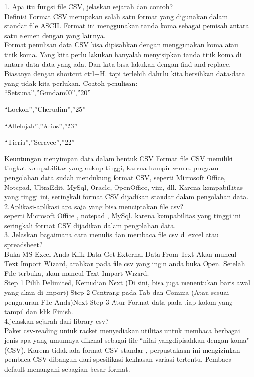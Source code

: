 1. Apa itu fungsi file CSV, jelaskan sejarah dan contoh?\\
Definisi
Format CSV merupakan salah satu format yang digunakan dalam standar file ASCII. Format ini menggunakan tanda koma sebagai pemisah antara satu elemen dengan yang lainnya.\\

Format penulisan data
CSV bisa dipisahkan dengan menggunakan koma atau titik koma. Yang kita perlu lakukan hanyalah menyisipkan tanda titik koma di antara data-data yang ada. Dan kita bisa lakukan dengan find and replace. Biasanya dengan shortcut ctrl+H. tapi terlebih dahulu kita bersihkan data-data yang tidak kita perlukan.
Contoh penulisan:\\
“Setsuna”,”Gundam00”,”20”

“Lockon”,”Cherudim”,”25”

“Allelujah”,”Arios”,”23”

“Tieria”,”Seravee”,”22”

Keuntungan menyimpan data dalam bentuk CSV
Format file CSV memiliki tingkat kompabilitas yang cukup tinggi, karena hampir semua program pengolahan data sudah mendukung format CSV, seperti Microsoft Office, Notepad, UltraEdit, MySql, Oracle, OpenOffice, vim, dll. Karena kompabillitas yang tinggi ini, seringkali format CSV dijadikan standar dalam pengolahan data.\\

2.Aplikasi-aplikasi apa saja yang bisa menciptakan file csv?\\
seperti Microsoft Office , notepad , MySql. karena kompabilitas yang tinggi ini seringkali format CSV dijadikan dalam pengolahan data.\\

3. Jelaskan bagaimana cara menulis dan membaca file csv di excel atau spreadsheet?\\
Buka MS Excel Anda
Klik Data Get External Data From Text
Akan muncul Text Import Wizard, arahkan pada file csv yang ingin anda buka Open.
Setelah File terbuka, akan muncul Text Import Wizard.\\

Step 1 Pilih Delimited, Kemudian Next (Di sini, bisa juga menentukan baris awal yang akan di import)
Step 2 Centrang pada Tab dan Comma (Atau sesuai pengaturan File Anda)Next
Step 3 Atur Format data pada tiap kolom yang tampil dan klik Finish.\\

4.jelaskan sejarah dari library csv?\\
Paket csv-reading untuk racket menyediakan utilitas untuk membaca berbagai jenis apa yang umumnya dikenal sebagai file “nilai yangdipisahkan dengan koma" (CSV). Karena tidak ada format CSV standar , perpustakaan ini mengizinkan pembaca CSV dibangun dari spesifikasi kekhasan variasi tertentu. Pembaca default menangani sebagian besar format.\\


